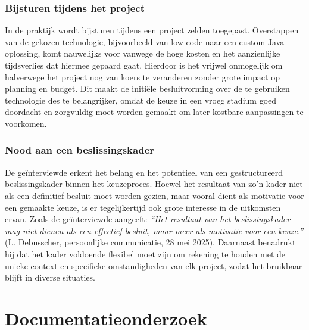 \subsubsection{Bijsturen tijdens het project}

In de praktijk wordt bijsturen tijdens een project zelden toegepast. Overstappen van de gekozen technologie, bijvoorbeeld van low-code naar een custom Java-oplossing, komt nauwelijks voor vanwege de hoge kosten en het aanzienlijke tijdsverlies dat hiermee gepaard gaat. Hierdoor is het vrijwel onmogelijk om halverwege het project nog van koers te veranderen zonder grote impact op planning en budget. Dit maakt de initiële besluitvorming over de te gebruiken technologie des te belangrijker, omdat de keuze in een vroeg stadium goed doordacht en zorgvuldig moet worden gemaakt om later kostbare aanpassingen te voorkomen.


\subsubsection{Nood aan een beslissingskader}

De geïnterviewde erkent het belang en het potentieel van een gestructureerd beslissingskader binnen het keuzeproces. Hoewel het resultaat van zo’n kader niet als een definitief besluit moet worden gezien, maar vooral dient als motivatie voor een gemaakte keuze, is er tegelijkertijd ook grote interesse in de uitkomsten ervan. Zoals de geïnterviewde aangeeft: \textit{“Het resultaat van het beslissingskader mag niet dienen als een effectief besluit, maar meer als motivatie voor een keuze.”} (L. Debusscher, persoonlijke communicatie, 28 mei 2025). Daarnaast benadrukt hij dat het kader voldoende flexibel moet zijn om rekening te houden met de unieke context en specifieke omstandigheden van elk project, zodat het bruikbaar blijft in diverse situaties.





\section{Documentatieonderzoek}

